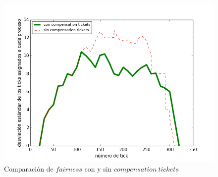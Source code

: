 \documentclass[a4paper]{article}
\begin{document}
\begin{figure}[H]
\centering
\includegraphics[scale=0.66]{../experimentacion/ej10-compensation/plot-comparativa.png}
\caption{Comparación de $fairness$ con y sin $compensation\ tickets$}
\end{figure}
\end{document}
